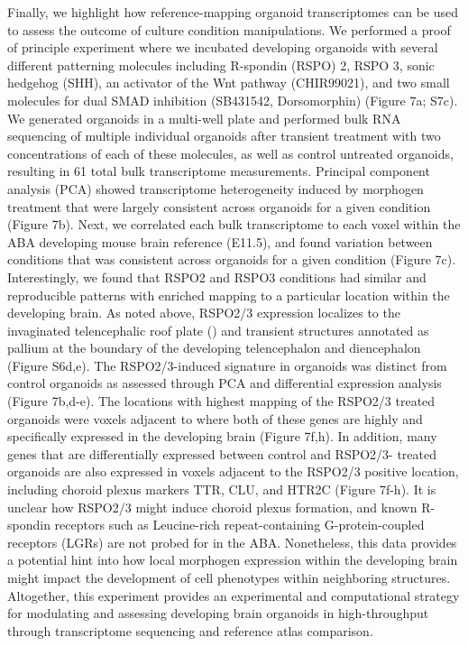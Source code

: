 Finally, we highlight how reference-mapping organoid transcriptomes can be used to assess the outcome of culture condition manipulations. We performed a proof of principle experiment where we incubated developing organoids with several different patterning molecules including R-spondin (RSPO) 2, RSPO 3, sonic hedgehog (SHH), an activator of the Wnt pathway (CHIR99021), and two small molecules for dual SMAD inhibition (SB431542, Dorsomorphin) (Figure 7a; S7c). We generated organoids in a multi-well plate and performed bulk RNA sequencing of multiple individual organoids after transient treatment with two concentrations of each of these molecules, as well as control untreated organoids, resulting in 61 total bulk transcriptome measurements. Principal component analysis (PCA) showed transcriptome heterogeneity induced by morphogen treatment that were largely consistent across organoids for a given condition (Figure 7b). Next, we correlated each bulk transcriptome to each voxel within the ABA developing mouse brain reference (E11.5), and found variation between conditions that was consistent across organoids for a given condition (Figure 7c). Interestingly, we found that RSPO2 and RSPO3 conditions had similar and reproducible patterns with enriched mapping to a particular location within the developing brain. As noted above, RSPO2/3 expression localizes to the invaginated telencephalic roof plate (\cite{kamata_r-spondin_2004}) and transient structures annotated as pallium at the boundary of the developing telencephalon and diencephalon (Figure S6d,e). The RSPO2/3-induced signature in organoids was distinct from control organoids as assessed through PCA and differential expression analysis (Figure 7b,d-e). The locations with highest mapping of the RSPO2/3 treated organoids were voxels adjacent to where both of these genes are highly and specifically expressed in the developing brain (Figure 7f,h). In addition, many genes that are differentially expressed between control and RSPO2/3- treated organoids are also expressed in voxels adjacent to the RSPO2/3 positive location, including choroid plexus markers TTR, CLU, and HTR2C (Figure 7f-h). It is unclear how RSPO2/3 might induce choroid plexus formation, and known R-spondin receptors such as Leucine-rich repeat-containing G-protein-coupled receptors (LGRs) are not probed for in the ABA. Nonetheless, this data provides a potential hint into how local morphogen expression within the developing brain might impact the development of cell phenotypes within neighboring structures. Altogether, this experiment provides an experimental and computational strategy for modulating and assessing developing brain organoids in high-throughput through transcriptome sequencing and reference atlas comparison.


